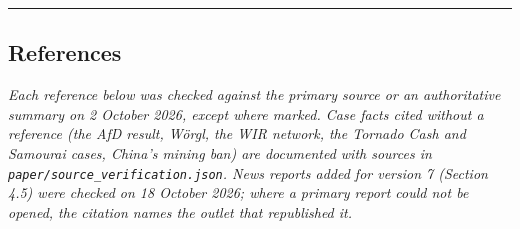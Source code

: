 \documentclass[
  10pt,
]{article}
\begin{document}
\begin{center}\rule{0.5\linewidth}{0.5pt}\end{center}

\subsection{References}\label{references}

\emph{Each reference below was checked against the primary source or an authoritative summary on 2
October 2026, except where marked. Case facts cited without a reference (the AfD result, Wörgl, the
WIR network, the Tornado Cash and Samourai cases, China's mining ban) are documented with sources in
\texttt{paper/source\_verification.json}. News reports added for version 7 (Section 4.5) were
checked on 18 October 2026; where a primary report could not be opened, the citation names the
outlet that republished it.}
\end{document}
